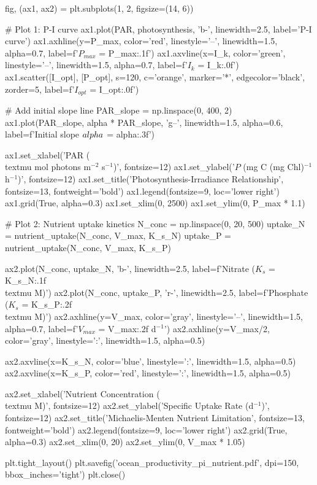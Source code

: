 \documentclass[a4paper, 11pt]{article}
\begin{document}
\begin{pycode}
fig, (ax1, ax2) = plt.subplots(1, 2, figsize=(14, 6))

# Plot 1: P-I curve
ax1.plot(PAR, photosynthesis, 'b-', linewidth=2.5, label='P-I curve')
ax1.axhline(y=P_max, color='red', linestyle='--', linewidth=1.5, alpha=0.7,
            label=f'$P_{{max}}$ = {P_max:.1f}')
ax1.axvline(x=I_k, color='green', linestyle='--', linewidth=1.5, alpha=0.7,
            label=f'$I_k$ = {I_k:.0f}')
ax1.scatter([I_opt], [P_opt], s=120, c='orange', marker='*', edgecolor='black',
            zorder=5, label=f'$I_{{opt}}$ = {I_opt:.0f}')

# Add initial slope line
PAR_slope = np.linspace(0, 400, 2)
ax1.plot(PAR_slope, alpha * PAR_slope, 'g--', linewidth=1.5, alpha=0.6,
         label=f'Initial slope $\\alpha$ = {alpha:.3f}')

ax1.set_xlabel('PAR (\\textmu mol photons m$^{-2}$ s$^{-1}$)', fontsize=12)
ax1.set_ylabel('$P$ (mg C (mg Chl)$^{-1}$ h$^{-1}$)', fontsize=12)
ax1.set_title('Photosynthesis-Irradiance Relationship', fontsize=13, fontweight='bold')
ax1.legend(fontsize=9, loc='lower right')
ax1.grid(True, alpha=0.3)
ax1.set_xlim(0, 2500)
ax1.set_ylim(0, P_max * 1.1)

# Plot 2: Nutrient uptake kinetics
N_conc = np.linspace(0, 20, 500)
uptake_N = nutrient_uptake(N_conc, V_max, K_s_N)
uptake_P = nutrient_uptake(N_conc, V_max, K_s_P)

ax2.plot(N_conc, uptake_N, 'b-', linewidth=2.5, label=f'Nitrate ($K_s$ = {K_s_N:.1f} \\textmu M)')
ax2.plot(N_conc, uptake_P, 'r-', linewidth=2.5, label=f'Phosphate ($K_s$ = {K_s_P:.2f} \\textmu M)')
ax2.axhline(y=V_max, color='gray', linestyle='--', linewidth=1.5, alpha=0.7,
            label=f'$V_{{max}}$ = {V_max:.2f} d$^{{-1}}$')
ax2.axhline(y=V_max/2, color='gray', linestyle=':', linewidth=1.5, alpha=0.5)

ax2.axvline(x=K_s_N, color='blue', linestyle=':', linewidth=1.5, alpha=0.5)
ax2.axvline(x=K_s_P, color='red', linestyle=':', linewidth=1.5, alpha=0.5)

ax2.set_xlabel('Nutrient Concentration (\\textmu M)', fontsize=12)
ax2.set_ylabel('Specific Uptake Rate (d$^{-1}$)', fontsize=12)
ax2.set_title('Michaelis-Menten Nutrient Limitation', fontsize=13, fontweight='bold')
ax2.legend(fontsize=9, loc='lower right')
ax2.grid(True, alpha=0.3)
ax2.set_xlim(0, 20)
ax2.set_ylim(0, V_max * 1.05)

plt.tight_layout()
plt.savefig('ocean_productivity_pi_nutrient.pdf', dpi=150, bbox_inches='tight')
plt.close()
\end{pycode}
\end{document}
